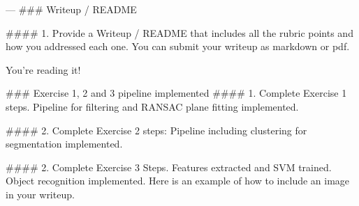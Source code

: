 \documentclass{article}
\begin{document}








---
### Writeup / README

#### 1. Provide a Writeup / README that includes all the rubric points and how you addressed each one.  You can submit your writeup as markdown or pdf.  

You're reading it!

### Exercise 1, 2 and 3 pipeline implemented
#### 1. Complete Exercise 1 steps. Pipeline for filtering and RANSAC plane fitting implemented.

#### 2. Complete Exercise 2 steps: Pipeline including clustering for segmentation implemented.  

#### 2. Complete Exercise 3 Steps.  Features extracted and SVM trained.  Object recognition implemented.
Here is an example of how to include an image in your writeup.
\end{document}
